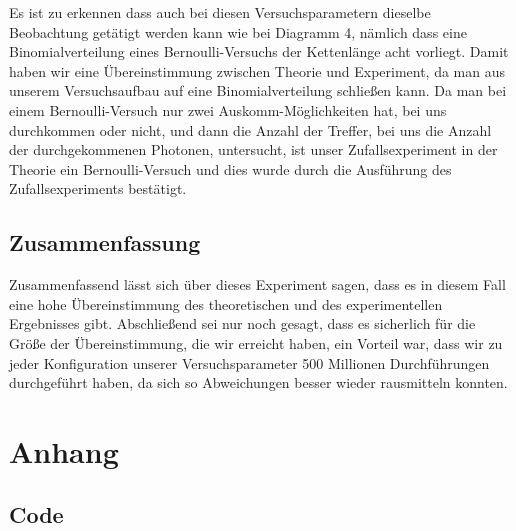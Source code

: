 Es ist zu erkennen dass auch bei diesen Versuchsparametern dieselbe Beobachtung getätigt werden kann wie bei Diagramm 4, nämlich dass eine Binomialverteilung eines Bernoulli-Versuchs der Kettenlänge acht vorliegt.
Damit haben wir eine Übereinstimmung zwischen Theorie und Experiment, da man aus unserem Versuchsaufbau auf eine Binomialverteilung schließen kann. Da man bei einem Bernoulli-Versuch nur zwei Auskomm-Möglichkeiten hat, bei uns durchkommen oder nicht, und dann die Anzahl der Treffer, bei uns die Anzahl der durchgekommenen Photonen, untersucht, ist unser Zufallsexperiment in der Theorie ein Bernoulli-Versuch und dies wurde durch die Ausführung des Zufallsexperiments bestätigt.



\subsection{Zusammenfassung}
Zusammenfassend lässt sich über dieses Experiment sagen, dass es in diesem Fall eine hohe Übereinstimmung des theoretischen und des experimentellen Ergebnisses gibt. Abschließend  sei nur noch gesagt, dass es sicherlich für die Größe der Übereinstimmung, die wir erreicht haben, ein Vorteil war, dass wir zu jeder Konfiguration unserer Versuchsparameter 500 Millionen Durchführungen durchgeführt haben, da sich so Abweichungen besser wieder rausmitteln konnten.

\clearpage
\section{Anhang}
\subsection{Code}
